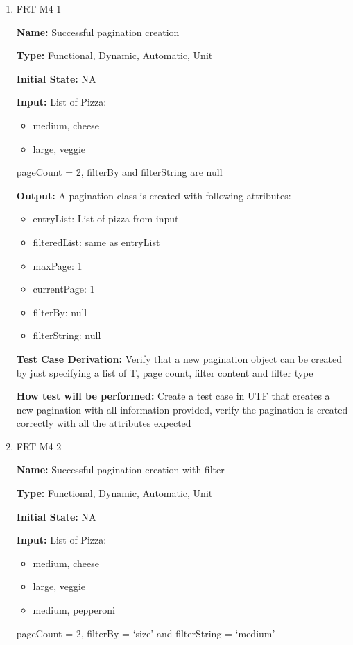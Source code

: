 \documentclass[12pt, titlepage]{article}
\begin{document}
\begin{enumerate}
\item{FRT-M4-1}

\textbf{Name:} Successful pagination creation

\textbf{Type:} Functional, Dynamic, Automatic, Unit
					
\textbf{Initial State:} NA
					
\textbf{Input:} List of Pizza:
\begin{itemize}
\item medium, cheese
\item large, veggie
\end{itemize}
pageCount = 2, filterBy and filterString are null
					
\textbf{Output:} A pagination class is created with following attributes:
\begin{itemize}
\item entryList: List of pizza from input
\item filteredList: same as entryList
\item maxPage: 1
\item currentPage: 1
\item filterBy: null
\item filterString: null
\end{itemize}

\textbf{Test Case Derivation:} Verify that a new pagination object can be created by just specifying a list of T, page count, filter content and filter type

\textbf{How test will be performed:} Create a test case in UTF that creates a new pagination with all information provided, verify the pagination is created correctly with all the attributes expected

\item{FRT-M4-2}

\textbf{Name:} Successful pagination creation with filter 

\textbf{Type:} Functional, Dynamic, Automatic, Unit
					
\textbf{Initial State:} NA
					
\textbf{Input:} List of Pizza:
\begin{itemize}
\item medium, cheese
\item large, veggie
\item medium, pepperoni
\end{itemize}
pageCount = 2, filterBy = `size' and filterString = `medium'
					

\end{enumerate}
\end{document}
